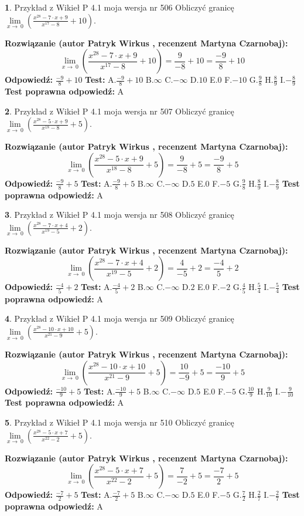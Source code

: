 \documentclass[12pt, a4paper]{article}
\theoremstyle{definition} %
\newtheorem{zad}{}
\newcommand{\zadStart}[1]{\begin{zad}#1\newline}
\newcommand{\zadStop}{\end{zad}}
\newcommand{\rozwStart}[2]{\noindent \textbf{Rozwiązanie (autor #1 , recenzent #2): }\newline}
\newcommand{\rozwStop}{\newline}
\newcommand{\odpStart}{\noindent \textbf{Odpowiedź:}\newline}
\newcommand{\odpStop}{\newline}
\newcommand{\testStart}{\noindent \textbf{Test:}\newline}
\newcommand{\testStop}{\newline}
\newcommand{\kluczStart}{\noindent \textbf{Test poprawna odpowiedź:}\newline}
\newcommand{\kluczStop}{\newline}
\begin{document}
\zadStart{Przykład z Wikieł P 4.1 moja wersja nr 506}
Obliczyć granicę $\lim\limits_{x\to\ 0}(\frac{x^{28}-7 \cdot x +9}{x^{17}-8}+10)$.
\zadStop
\rozwStart{Patryk Wirkus}{Martyna Czarnobaj}
$$\lim\limits_{x\to\ 0}(\frac{x^{28}-7 \cdot x +9}{x^{17}-8}+10)=\frac{9}{-8}+10=\frac{-9}{8}+10$$
\rozwStop
\odpStart
$\frac{-9}{8}+10$
\odpStop
\testStart
A.$\frac{-9}{8}+10$
B.$\infty$
C.$-\infty$
D.$10$
E.$0$
F.$-10$
G.$\frac{9}{8}$
H.$\frac{8}{9}$
I.$-\frac{8}{9}$
\testStop
\kluczStart
A
\kluczStop



\zadStart{Przykład z Wikieł P 4.1 moja wersja nr 507}
Obliczyć granicę $\lim\limits_{x\to\ 0}(\frac{x^{28}-5 \cdot x +9}{x^{18}-8}+5)$.
\zadStop
\rozwStart{Patryk Wirkus}{Martyna Czarnobaj}
$$\lim\limits_{x\to\ 0}(\frac{x^{28}-5 \cdot x +9}{x^{18}-8}+5)=\frac{9}{-8}+5=\frac{-9}{8}+5$$
\rozwStop
\odpStart
$\frac{-9}{8}+5$
\odpStop
\testStart
A.$\frac{-9}{8}+5$
B.$\infty$
C.$-\infty$
D.$5$
E.$0$
F.$-5$
G.$\frac{9}{8}$
H.$\frac{8}{9}$
I.$-\frac{8}{9}$
\testStop
\kluczStart
A
\kluczStop



\zadStart{Przykład z Wikieł P 4.1 moja wersja nr 508}
Obliczyć granicę $\lim\limits_{x\to\ 0}(\frac{x^{28}-7 \cdot x +4}{x^{19}-5}+2)$.
\zadStop
\rozwStart{Patryk Wirkus}{Martyna Czarnobaj}
$$\lim\limits_{x\to\ 0}(\frac{x^{28}-7 \cdot x +4}{x^{19}-5}+2)=\frac{4}{-5}+2=\frac{-4}{5}+2$$
\rozwStop
\odpStart
$\frac{-4}{5}+2$
\odpStop
\testStart
A.$\frac{-4}{5}+2$
B.$\infty$
C.$-\infty$
D.$2$
E.$0$
F.$-2$
G.$\frac{4}{5}$
H.$\frac{5}{4}$
I.$-\frac{5}{4}$
\testStop
\kluczStart
A
\kluczStop



\zadStart{Przykład z Wikieł P 4.1 moja wersja nr 509}
Obliczyć granicę $\lim\limits_{x\to\ 0}(\frac{x^{28}-10 \cdot x +10}{x^{21}-9}+5)$.
\zadStop
\rozwStart{Patryk Wirkus}{Martyna Czarnobaj}
$$\lim\limits_{x\to\ 0}(\frac{x^{28}-10 \cdot x +10}{x^{21}-9}+5)=\frac{10}{-9}+5=\frac{-10}{9}+5$$
\rozwStop
\odpStart
$\frac{-10}{9}+5$
\odpStop
\testStart
A.$\frac{-10}{9}+5$
B.$\infty$
C.$-\infty$
D.$5$
E.$0$
F.$-5$
G.$\frac{10}{9}$
H.$\frac{9}{10}$
I.$-\frac{9}{10}$
\testStop
\kluczStart
A
\kluczStop



\zadStart{Przykład z Wikieł P 4.1 moja wersja nr 510}
Obliczyć granicę $\lim\limits_{x\to\ 0}(\frac{x^{28}-5 \cdot x +7}{x^{22}-2}+5)$.
\zadStop
\rozwStart{Patryk Wirkus}{Martyna Czarnobaj}
$$\lim\limits_{x\to\ 0}(\frac{x^{28}-5 \cdot x +7}{x^{22}-2}+5)=\frac{7}{-2}+5=\frac{-7}{2}+5$$
\rozwStop
\odpStart
$\frac{-7}{2}+5$
\odpStop
\testStart
A.$\frac{-7}{2}+5$
B.$\infty$
C.$-\infty$
D.$5$
E.$0$
F.$-5$
G.$\frac{7}{2}$
H.$\frac{2}{7}$
I.$-\frac{2}{7}$
\testStop
\kluczStart
A
\kluczStop
\end{document}
